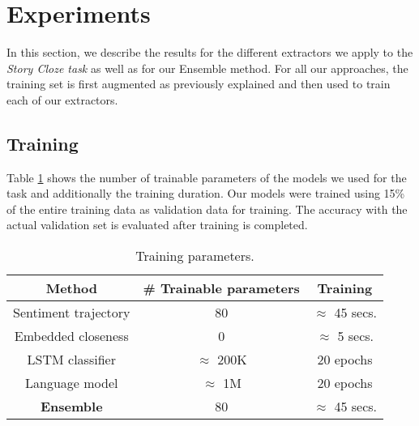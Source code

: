\documentclass{article}
\begin{document}
\section{Experiments}
\label{sec:exp}

In this section, we describe the results for the different extractors we apply
to the {\it Story Cloze task} as well as for our Ensemble method. For all our
approaches, the training set is first augmented as previously explained and then
used to train each of our extractors.

\subsection{Training}
\label{subsec:training}

Table \ref{tab:params} shows the number of trainable parameters of the models we
used for the task and additionally the training duration. Our models were
trained using 15\% of the entire training data as validation data for training.
The accuracy with the actual validation set is evaluated after training is
completed. 

\begin{table}
    \caption{Training parameters.}
    \begin{center}
        \label{tab:params}
        \begin{tabular}{||c c c||} 
            \hline
            Method                 & \# Trainable parameters   & Training \\ [0.5ex] 
            \hline\hline
            Sentiment trajectory   & 80                        & $ \approx $ 45 secs. \\ 
            \hline
            Embedded closeness     & 0                         & $ \approx $ 5 secs.  \\
            \hline
            LSTM classifier        & $ \approx $ 200K          & 20 epochs \\ %
            \hline
            Language model         & $ \approx $ 1M            & 20 epochs \\ %
            \hline
            \textbf{Ensemble}      & 80                        & $ \approx $ 45 secs.  \\ [1ex] 
            \hline
        \end{tabular}
    \end{center}
\end{table}
\end{document}
